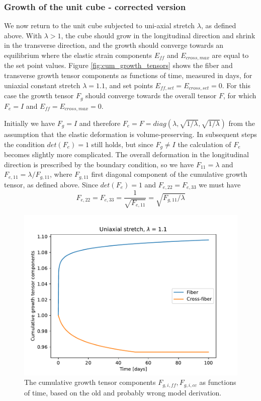 \documentclass[a4paper,10pt]{article}
\begin{document}
\subsubsection{Growth of the unit cube - corrected version} 
We now return to the unit cube subjected to uni-axial stretch $\lambda$, as defined above. With $\lambda > 1$, the cube 
should grow in the longitudinal direction and shrink in the transverse direction, and the growth should converge towards
an equilibrium where the elastic strain components $E_{ff}$ and $E_{cross,max}$ are equal to the set point values.
Figure \ref{fig:cum_growth_tensors} shows the fiber and transverse growth tensor components as functions of time, 
measured in days, for uniaxial constant stretch $\lambda = 1.1$, and set points $E_{ff, set} = E_{cross,set} = 0$. 
For this case the growth tensor $F_g$ should converge towards the overall tensor $F$, for which $F_e = I$ and 
$E_{ff} = E_{cross,max} = 0$. 

Initially we have $F_g = I$ and therefore $F_e = F = diag(\lambda, \sqrt{1/\lambda}, \sqrt{1/\lambda})$ from 
the assumption that the elastic deformation is volume-preserving. In subsequent steps the condition
$det(F_e) = 1$ still holds, but since $F_g \neq I$ the calculation of $F_e$ becomes slightly more complicated.
The overall deformation in the longitudinal direction is prescribed by the boundary condition, so we have
$F_{11} = \lambda$ and $F_{e,11} = \lambda / F_{g,11}$, where $F_{g,11}$ first diagonal component of the 
cumulative growth tensor, as defined above. Since $det(F_e) = 1$ and $F_{e,22} = F_{e,33}$ we must have
\[
F_{e,22} = F_{e,33} = \frac{1}{\sqrt{F_{e,11}}} = \sqrt{F_{g,11}/ \lambda}
\]

\begin{figure}
  \centerline{
    \includegraphics{figs/cumulative_growth_old}
  }
\caption{The cumulative growth tensor components $F_{g,i,ff}, F_{g,i,cc}$ as functions of time, based on
the old and probably wrong model derivation.}
\label{fig:cum_growth_tensors_old}
\end{figure}
\end{document}
